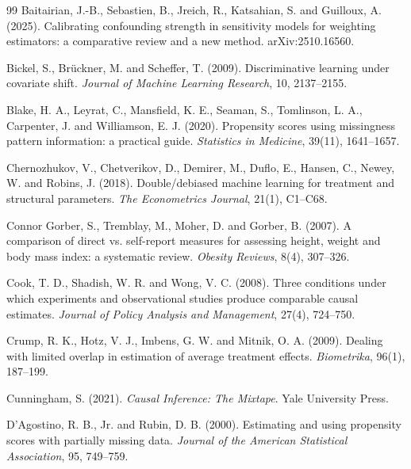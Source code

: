 \documentclass[twoside,11pt]{article}
\theoremstyle{plain}
\theoremstyle{definition}
\begin{document}
\begin{thebibliography}{99}\small
{} Baitairian, J.-B., Sebastien, B., Jreich, R., Katsahian, S. and Guilloux, A. (2025). Calibrating confounding strength in sensitivity models for weighting estimators: a comparative review and a new method. arXiv:2510.16560.

 Bickel, S., Brückner, M. and Scheffer, T. (2009). Discriminative learning under covariate shift. \emph{Journal of Machine Learning Research}, 10, 2137--2155.

 Blake, H. A., Leyrat, C., Mansfield, K. E., Seaman, S., Tomlinson, L. A., Carpenter, J. and Williamson, E. J. (2020). Propensity scores using missingness pattern information: a practical guide. \emph{Statistics in Medicine}, 39(11), 1641--1657.

 Chernozhukov, V., Chetverikov, D., Demirer, M., Duflo, E., Hansen, C., Newey, W. and Robins, J. (2018). Double/debiased machine learning for treatment and structural parameters. \emph{The Econometrics Journal}, 21(1), C1--C68.

 Connor Gorber, S., Tremblay, M., Moher, D. and Gorber, B. (2007). A comparison of direct vs. self-report measures for assessing height, weight and body mass index: a systematic review. \emph{Obesity Reviews}, 8(4), 307--326.

 Cook, T. D., Shadish, W. R. and Wong, V. C. (2008). Three conditions under which experiments and observational studies produce comparable causal estimates. \emph{Journal of Policy Analysis and Management}, 27(4), 724--750.

 Crump, R. K., Hotz, V. J., Imbens, G. W. and Mitnik, O. A. (2009). Dealing with limited overlap in estimation of average treatment effects. \emph{Biometrika}, 96(1), 187--199.

 Cunningham, S. (2021). \emph{Causal Inference: The Mixtape}. Yale University Press.

 D'Agostino, R. B., Jr. and Rubin, D. B. (2000). Estimating and using propensity scores with partially missing data. \emph{Journal of the American Statistical Association}, 95, 749--759.


\end{thebibliography}
\end{document}
